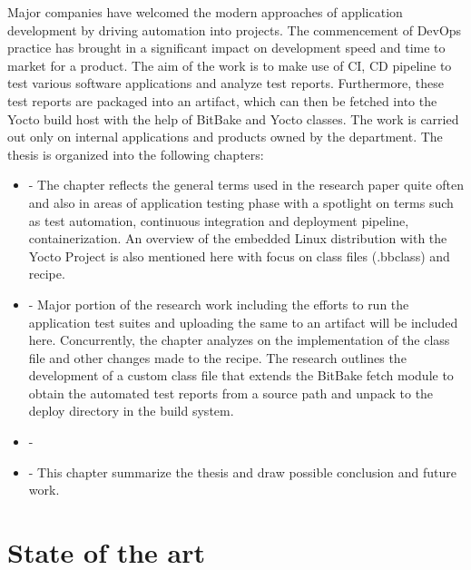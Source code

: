 Major companies have welcomed the modern approaches of application development by driving automation into projects. The commencement of DevOps practice has brought in a significant impact on development speed and time to market for a product. The aim of the work is to make use of \ac{CI}, \ac{CD} pipeline to test various software applications and analyze test reports. Furthermore, these test reports are packaged into an artifact, which can then be fetched into the Yocto build host with the help of BitBake and Yocto classes. The work is carried out only on internal applications and products owned by the department. The thesis is organized into the following chapters:  
\begin{itemize}
\item {} - The chapter reflects the general terms used in the research paper quite often and also in areas of application testing phase with a spotlight on terms such as test automation, continuous integration and deployment pipeline, containerization. An overview of the embedded Linux distribution with the Yocto Project is also mentioned here with focus on class files (.bbclass) and recipe.

\item {} - Major portion of the research work including the efforts to run the application test suites and uploading the same to an artifact will be included here. Concurrently, the chapter analyzes on the implementation of the class file and other changes made to the recipe. The research outlines the development of a custom class file that extends the BitBake fetch module to obtain the automated test reports from a source path and unpack to the deploy directory in the build system. 

\item  {} - 

\item {} - This chapter summarize the thesis and draw possible conclusion and future work.

\end{itemize}



\section{State of the art}

\clearpage\null\thispagestyle{empty}